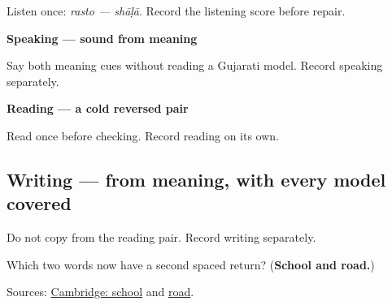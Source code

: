 Listen once: \emph{rasto — shāḷā}. Record the listening score before repair.

\textbf{Speaking — sound from meaning}

Say both meaning cues without reading a Gujarati model. Record speaking separately.

\textbf{Reading — a cold reversed pair}

Read once before checking. Record reading on its own.

\subsection*{Writing — from meaning, with every model covered}
Do not copy from the reading pair. Record writing separately.

\begin{tcolorbox}[breakable,colback=teal!4,colframe=teal!35!black,title={Before you move on}]
Which two words now have a second spaced return? (\textbf{School and road.})

Sources: \href{https://dictionary.cambridge.org/dictionary/english-gujarati/school}{Cambridge: school} and \href{https://dictionary.cambridge.org/dictionary/english-gujarati/road}{road}.
\end{tcolorbox}
